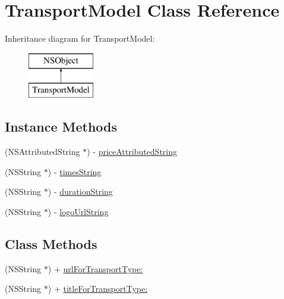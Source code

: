 \hypertarget{interface_transport_model}{}\section{Transport\+Model Class Reference}
\label{interface_transport_model}
Inheritance diagram for Transport\+Model\+:\begin{figure}[H]
\begin{center}
\leavevmode
\includegraphics[height=2.000000cm]{interface_transport_model}
\end{center}
\end{figure}
\subsection*{Instance Methods}
\begin{DoxyCompactItemize}
\item 
(N\+S\+Attributed\+String $\ast$) -\/ \hyperlink{interface_transport_model_a25724cdc8e6c33c46125957d1541c9ca}{price\+Attributed\+String}
\item 
(N\+S\+String $\ast$) -\/ \hyperlink{interface_transport_model_a5636caa4f2f470b12e06abb5fb71abd8}{times\+String}
\item 
(N\+S\+String $\ast$) -\/ \hyperlink{interface_transport_model_adac7ca4642f31f96ef586fa268a9e6e2}{duration\+String}
\item 
(N\+S\+String $\ast$) -\/ \hyperlink{interface_transport_model_a631f9f2293d18fe5c311ba5be0d49dce}{logo\+Url\+String}
\end{DoxyCompactItemize}
\subsection*{Class Methods}
\begin{DoxyCompactItemize}
\item 
(N\+S\+String $\ast$) + \hyperlink{interface_transport_model_acfded3dc03dec0be05ae3d9d44eaba74}{url\+For\+Transport\+Type\+:}
\item 
(N\+S\+String $\ast$) + \hyperlink{interface_transport_model_af72dbb3813ea000fe2a67221690d6b47}{title\+For\+Transport\+Type\+:}
\end{DoxyCompactItemize}
